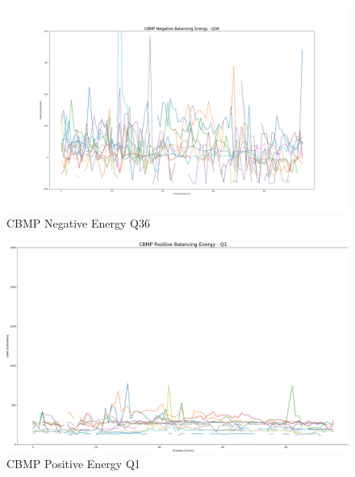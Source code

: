 \begin{figure}[H]
	\centering
	\includegraphics[width=1\linewidth]{pictures/results/CBMP_negBal_Q36.png}
	\caption{CBMP Negative Energy Q36}
	\label{fig:CBMP_negBal_Q36}
\end{figure}

\begin{figure}[H]
	\includegraphics[width=1\linewidth]{pictures/results/CBMP_PosBal_Q1.png}
	\caption{CBMP Positive Energy Q1}
	\label{fig:CBMP_PosBal_Q1}
\end{figure}

